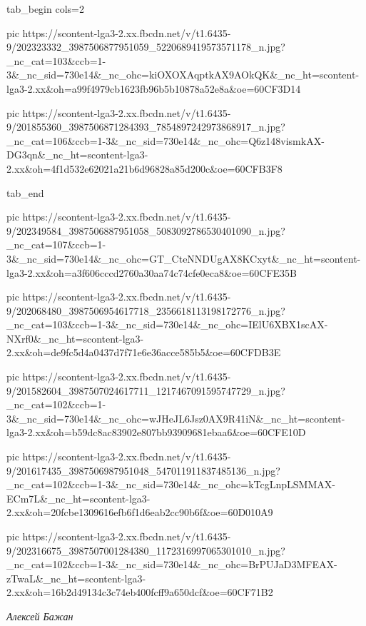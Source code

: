 \ifcmt
  tab_begin cols=2

     pic https://scontent-lga3-2.xx.fbcdn.net/v/t1.6435-9/202323332_3987506877951059_5220689419573571178_n.jpg?_nc_cat=103&ccb=1-3&_nc_sid=730e14&_nc_ohc=kiOXOXAqptkAX9AOkQK&_nc_ht=scontent-lga3-2.xx&oh=a99f4979cb1623fb96b5b10878a52e8a&oe=60CF3D14

     pic https://scontent-lga3-2.xx.fbcdn.net/v/t1.6435-9/201855360_3987506871284393_7854897242973868917_n.jpg?_nc_cat=106&ccb=1-3&_nc_sid=730e14&_nc_ohc=Q6z148vismkAX-DG3qn&_nc_ht=scontent-lga3-2.xx&oh=4f1d532e62021a21b6d96828a85d200c&oe=60CFB3F8

  tab_end
\fi

\ifcmt
  pic https://scontent-lga3-2.xx.fbcdn.net/v/t1.6435-9/202349584_3987506887951058_5083092786530401090_n.jpg?_nc_cat=107&ccb=1-3&_nc_sid=730e14&_nc_ohc=GT_CteNNDUgAX8KCxyt&_nc_ht=scontent-lga3-2.xx&oh=a3f606cccd2760a30aa74c74cfe0eca8&oe=60CFE35B

  pic https://scontent-lga3-2.xx.fbcdn.net/v/t1.6435-9/202068480_3987506954617718_2356618113198172776_n.jpg?_nc_cat=103&ccb=1-3&_nc_sid=730e14&_nc_ohc=IElU6XBX1scAX-NXrf0&_nc_ht=scontent-lga3-2.xx&oh=de9fc5d4a0437d7f71e6e36acce585b5&oe=60CFDB3E

  pic https://scontent-lga3-2.xx.fbcdn.net/v/t1.6435-9/201582604_3987507024617711_1217467091595747729_n.jpg?_nc_cat=102&ccb=1-3&_nc_sid=730e14&_nc_ohc=wJHeJL6Jsz0AX9R41iN&_nc_ht=scontent-lga3-2.xx&oh=b59dc8ac83902e807bb93909681ebaa6&oe=60CFE10D

  pic https://scontent-lga3-2.xx.fbcdn.net/v/t1.6435-9/201617435_3987506987951048_547011911837485136_n.jpg?_nc_cat=102&ccb=1-3&_nc_sid=730e14&_nc_ohc=kTcgLnpLSMMAX-ECm7L&_nc_ht=scontent-lga3-2.xx&oh=20fcbe1309616efb6f1d6eab2cc90b6f&oe=60D010A9

  pic https://scontent-lga3-2.xx.fbcdn.net/v/t1.6435-9/202316675_3987507001284380_1172316997065301010_n.jpg?_nc_cat=102&ccb=1-3&_nc_sid=730e14&_nc_ohc=BrPUJaD3MFEAX-zTwaL&_nc_ht=scontent-lga3-2.xx&oh=16b2d49134c3c74eb400fcff9a650dcf&oe=60CF71B2
\fi

\emph{Алексей Бажан}

